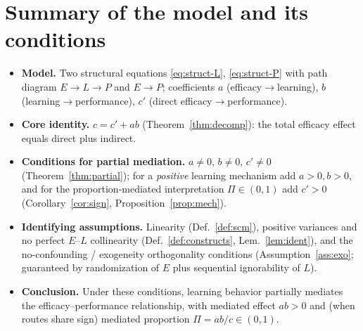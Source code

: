 \documentclass{amsart}
\theoremstyle{definition}
\begin{document}
\section{Summary of the model and its conditions}

\begin{itemize}
\item \textbf{Model.} Two structural equations \eqref{eq:struct-L},
\eqref{eq:struct-P} with path diagram $E\to L\to P$ and $E\to P$; coefficients
$a$ (efficacy$\to$learning), $b$ (learning$\to$performance), $c'$ (direct
efficacy$\to$performance).
\item \textbf{Core identity.} $c=c'+ab$ (Theorem~\ref{thm:decomp}): the total
efficacy effect equals direct plus indirect.
\item \textbf{Conditions for partial mediation.} $a\neq0$, $b\neq0$, $c'\neq0$
(Theorem~\ref{thm:partial}); for a \emph{positive} learning mechanism add
$a>0,b>0$, and for the proportion-mediated interpretation $\Pi\in(0,1)$ add
$c'>0$ (Corollary~\ref{cor:sign}, Proposition~\ref{prop:mech}).
\item \textbf{Identifying assumptions.} Linearity (Def.~\ref{def:scm}),
positive variances and no perfect $E$--$L$ collinearity
(Def.~\ref{def:constructs}, Lem.~\ref{lem:ident}), and the no-confounding /
exogeneity orthogonality conditions (Assumption~\ref{ass:exo}; guaranteed by
randomization of $E$ plus sequential ignorability of $L$).
\item \textbf{Conclusion.} Under these conditions, learning behavior partially
mediates the efficacy--performance relationship, with mediated effect $ab>0$ and
(when routes share sign) mediated proportion $\Pi=ab/c\in(0,1)$.
\end{itemize}
\end{document}
